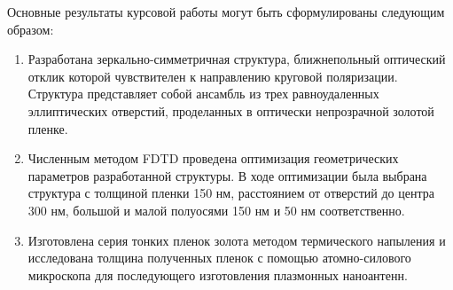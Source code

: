 
Основные результаты курсовой работы могут быть сформулированы следующим образом:
\begin{enumerate}
\item Разработана зеркально-симметричная структура, ближнепольный оптический отклик которой чувствителен к направлению круговой поляризации. Структура представляет собой ансамбль из трех равноудаленных эллиптических отверстий, проделанных в оптически непрозрачной золотой пленке.

\item Численным методом FDTD проведена оптимизация геометрических параметров разработанной структуры. В ходе оптимизации была выбрана структура с толщиной пленки 150 нм, расстоянием от отверстий до центра 300 нм, большой и малой полуосями 150 нм и 50 нм соответственно.

\item Изготовлена серия тонких пленок золота методом термического напыления и исследована толщина полученных пленок с помощью атомно-силового микроскопа для последующего изготовления плазмонных наноантенн.
\end{enumerate}